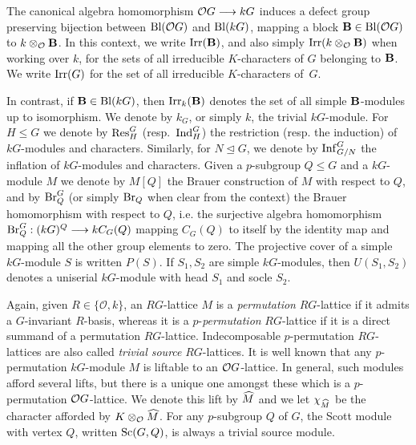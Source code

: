 \par
The canonical algebra homomorphism ${\mathcal{O}} G\longrightarrow kG$ induces a defect group preserving bijection between $\operatorname{Bl}({\mathcal{O}} G)$ and $\operatorname{Bl}(kG)$, mapping a block ${\mathbf{B}}\in \operatorname{Bl}({\mathcal{O}} G)$ to $k\otimes_{{\mathcal{O}}}{\mathbf{B}}$. In this context, we write $\operatorname{Irr}({\mathbf{B}})$,  and also simply $\operatorname{Irr}(k\otimes_{{\mathcal{O}}}{\mathbf{B}})$ when working over $k$, 
for the sets of all
irreducible 
$K$-characters 
of $G$ belonging to ${\mathbf{B}}$. We write $\operatorname{Irr}(G)$ for the set of all irreducible $K$-characters of~$G$.
\par
In contrast, if ${\mathbf{B}}\in\operatorname{Bl}(kG)$, then $\operatorname{Irr}_k({\mathbf{B}})$ denotes the set of all simple ${\mathbf{B}}$-modules up to isomorphism. 
We denote by $k_G$, or simply $k$,  the trivial $kG$-module. 
For $H\leq G$ we denote by $\operatorname{Res}^G_H$ (resp.~$\operatorname{Ind}_H^G$) the restriction (resp. the induction) of $kG$-modules and characters. Similarly, for $N\unlhd G$, we denote by $\operatorname{Inf}_{G/N}^{G}$ the inflation of $kG$-modules and characters. Given a $p$-subgroup $Q\leq G$ and a $kG$-module $M$  we denote by $M[Q]$ the Brauer construction of $M$ with respect to $Q$, and by $\operatorname{Br}^G_Q$ (or simply $\operatorname{Br}_Q$ when clear from the context)  the Brauer homomorphism  with respect to $Q$, i.e. the surjective algebra homomorphism $\operatorname{Br}^G_Q: (kG)^Q\longrightarrow kC_G(Q)$
mapping $C_G(Q)$ to itself by the identity map and mapping all the other group
elements to zero. The projective cover of a simple $kG$-module $S$ is written $P(S)$. If $S_1,S_2$ are simple $kG$-modules, then $U(S_1,S_2)$ denotes a uniserial $kG$-module with head $S_1$ and socle $S_2$. 
\par
Again, given $R\in\{\mathcal{O},k\}$, an $RG$-lattice $M$ is a \emph{permutation} $RG$-lattice if it admits a $G$-invariant $R$-basis, whereas it is a $p$-\emph{permutation} $RG$-lattice if it is a direct summand of a permutation $RG$-lattice. Indecomposable $p$-permutation $RG$-lattices are also called \emph{trivial source} $RG$-lattices. 
It is well known that any $p$-permutation $kG$-module $M$ is liftable to an ${\mathcal{O}} G$-lattice. In general, such modules afford several lifts, but there is a unique one amongst these which is a $p$-permutation ${\mathcal{O}} G$-lattice. We denote this lift by $\widehat{M}$ and we let $\chi_{\widehat{M}}$ be the character afforded by $K\otimes_{{\mathcal{O}}}\widehat{M}$.
For any $p$-subgroup $Q$ of $G$, the Scott module with vertex $Q$, written $\operatorname{Sc}(G,Q)$, is always a trivial source module. 
